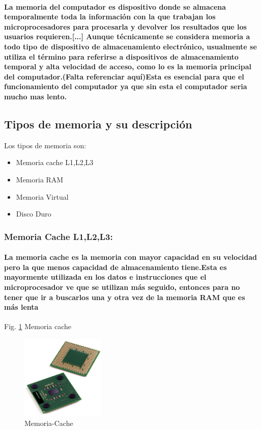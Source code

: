 \documentclass{article}
\begin{document}
\paragraph{La memoria del computador es dispositivo donde se almacena temporalmente toda la información con la que trabajan los microprocesadores para procesarla y devolver los resultados que los usuarios requieren.[...] Aunque técnicamente se considera memoria a todo tipo de dispositivo de almacenamiento
electrónico, usualmente se utiliza el término para referirse a dispositivos de almacenamiento
temporal y alta velocidad de acceso, como lo es la memoria principal del computador.(Falta referenciar aquí)\cite{taller}Esta es esencial para que el funcionamiento del computador ya que sin esta el computador seria mucho mas lento.}

\subsection{Tipos de memoria y su descripción}

Los tipos de memoria son:
\begin{itemize}
    \item Memoria cache L1,L2,L3
    \item Memoria RAM
    \item Memoria Virtual
    \item Disco Duro
\end{itemize}

\subsubsection{Memoria Cache L1,L2,L3:}

\paragraph{La memoria cache es la memoria con mayor capacidad en su velocidad pero la que menos capacidad de almacenamiento tiene.Esta es mayormente utilizada en los datos e instrucciones que el microprocesador
ve que se utilizan más seguido, entonces para no tener que ir a buscarlos una y otra vez de la
memoria RAM que es más lenta\cite{taller}}

Fig. \ref{fig:Memoria-Cache} Memoria cache
    \begin{figure}[h]
    \includegraphics[width=4cm]{Memoria-Cache.jpg}
    \centering
    \caption{Memoria-Cache}
    \label{fig:Memoria-Cache}
    \end{figure}
\end{document}
